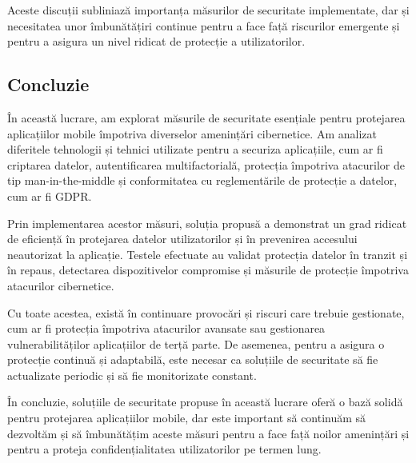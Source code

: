 \documentclass[runningheads]{llncs}
\begin{document}
Aceste discuții subliniază importanța măsurilor de securitate implementate, dar și necesitatea unor îmbunătățiri continue pentru a face față riscurilor emergente și pentru a asigura un nivel ridicat de protecție a utilizatorilor.


\subsection{Concluzie}
În această lucrare, am explorat măsurile de securitate esențiale pentru protejarea aplicațiilor mobile împotriva diverselor amenințări cibernetice. Am analizat diferitele tehnologii și tehnici utilizate pentru a securiza aplicațiile, cum ar fi criptarea datelor, autentificarea multifactorială, protecția împotriva atacurilor de tip man-in-the-middle și conformitatea cu reglementările de protecție a datelor, cum ar fi GDPR.

Prin implementarea acestor măsuri, soluția propusă a demonstrat un grad ridicat de eficiență în protejarea datelor utilizatorilor și în prevenirea accesului neautorizat la aplicație. Testele efectuate au validat protecția datelor în tranzit și în repaus, detectarea dispozitivelor compromise și măsurile de protecție împotriva atacurilor cibernetice.

Cu toate acestea, există în continuare provocări și riscuri care trebuie gestionate, cum ar fi protecția împotriva atacurilor avansate sau gestionarea vulnerabilităților aplicațiilor de terță parte. De asemenea, pentru a asigura o protecție continuă și adaptabilă, este necesar ca soluțiile de securitate să fie actualizate periodic și să fie monitorizate constant.

În concluzie, soluțiile de securitate propuse în această lucrare oferă o bază solidă pentru protejarea aplicațiilor mobile, dar este important să continuăm să dezvoltăm și să îmbunătățim aceste măsuri pentru a face față noilor amenințări și pentru a proteja confidențialitatea utilizatorilor pe termen lung.

%
%



\end{document}
